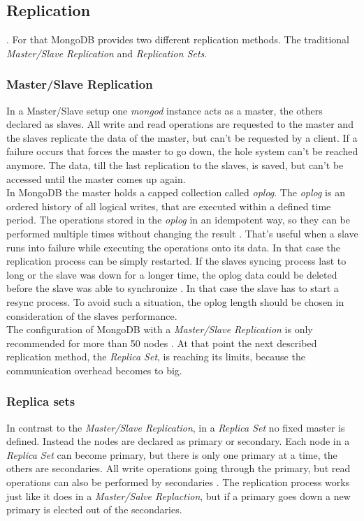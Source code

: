 \subsection{Replication}
. For that MongoDB provides two different replication methods. The traditional \textit{Master/Slave Replication} and \textit{Replication Sets}.

\subsubsection{Master/Slave Replication}
In a Master/Slave setup one \textit{mongod} instance acts as a master, the others declared as slaves. All write and read operations are requested to the master and the slaves replicate the data of the master, but can't be requested by a client. If a failure occurs that forces the master to go down, the hole system can't be reached anymore. The data, till the last replication to the slaves, is saved, but can't be accessed until the master comes up again. \\
In MongoDB the master holds a capped collection called \textit{oplog}. The \textit{oplog} is an ordered history of all logical writes, that are executed within a defined time period. The operations stored in the \textit{oplog} in an idempotent way, so they can be performed multiple times without changing the result \cite{Edward2015}. That's useful when a slave runs into failure while executing the operations onto its data. In that case the replication process can be simply restarted. If the slaves syncing process last to long or the slave was down for a longer time, the oplog data could be deleted before the slave was able to synchronize \cite{Edward2015}. In that case the slave has to start a resync process. To avoid such a situation, the oplog length should be chosen in consideration of the slaves performance.\\
The configuration of MongoDB with a \textit{Master/Slave Replication} is only recommended for more than 50 nodes \cite{Edward2015}. At that point the next described replication method, the \textit{Replica Set}, is reaching its limits, because the communication overhead becomes to big.

\subsubsection{Replica sets}
In contrast to the \textit{Master/Slave Replication}, in a \textit{Replica Set} no fixed master is defined. Instead the nodes are declared as primary or secondary. Each node in a \textit{Replica Set} can become primary, but there is only one primary at a time, the others are secondaries. All write operations going through the primary, but read operations can also be performed by secondaries \cite{Edward2015}. The replication process works just like it does in a \textit{Master/Salve Replaction}, but if a primary goes down a new primary is elected out of the secondaries.

